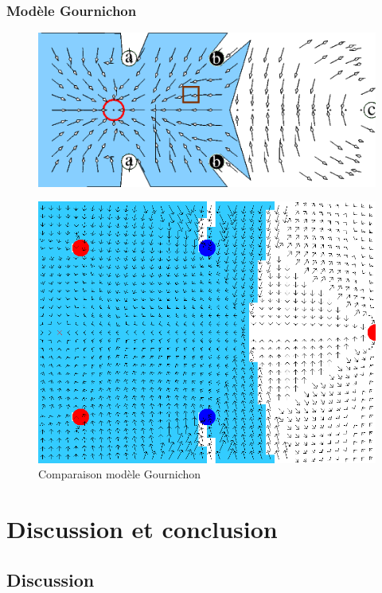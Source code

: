\documentclass{beamer}
\begin{document}
\begin{frame}
  \frametitle{Modèle Gournichon}
  \begin{figure}
    \centering
    \includegraphics[scale=0.3]{color_article.png}
  \end{figure}
  \begin{figure}
    \centering
    \includegraphics[scale=0.15]{color_res.png}
    \caption{Comparaison modèle Gournichon}
  \end{figure}  
\end{frame}

\section{Discussion et conclusion}

\subsection{Discussion}
\end{document}
